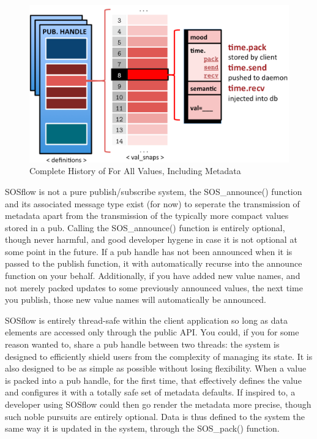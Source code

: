 \begin{figure}[!t]
\centering
\includegraphics[width=5in]{images/val_snaps.png}
\caption{Complete History of For All Values, Including Metadata}
\label{fig_sim}
\end{figure}

SOSflow is not a pure publish/subscribe system, the SOS\_announce()
function and its associated message type exist (for now) to seperate the
transmission of metadata apart from the transmission of the typically
more compact values stored in a pub.
%
Calling the SOS\_announce() function is entirely optional, though
never harmful, and good developer hygene in case it is not optional at
some point in the future.
%
If a pub handle has not been announced when it is passed to the
publish function, it with automatically recurse into the announce
function on your behalf.
%
Additionally, if you have added new value names, and not merely packed
updates to some previously announced values, the next time you
publish, those new value names will automatically be announced.

SOSflow is entirely thread-safe within the client application so long
as data elements are accessed only through the public API.
%
You could, if you for some reason wanted to, share a pub handle
between two threads: the system is designed to efficiently shield
users from the complexity of managing its state.
%
It is also designed to be as simple as possible without losing
flexibility.
%
When a value is packed into a pub handle, for the first time, that
effectively defines the value and configures it with a totally safe
set of metadata defaults.
%
If inspired to, a developer using SOSflow could then go render the
metadata more precise, though such noble pursuits are entirely
optional.
%
Data is thus defined to the system the same way it is updated in the
system, through the SOS\_pack() function.

